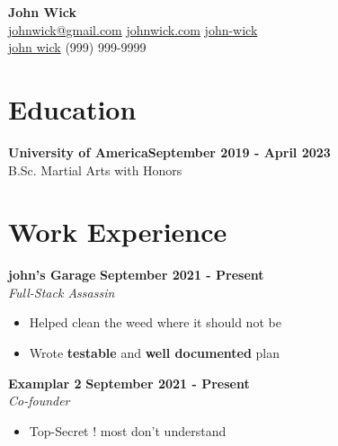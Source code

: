 \documentclass[letterpaper, 11pt]{article}
\newcommand{\iconSpace}{\hspace{1px}}
\newcommand{\bulletSpace}{\vspace{-8pt}}
\newcommand{\hSpace}{\hspace{8px}}
\newcommand{\secStartSpace}{\vspace{3pt}}
\newcommand{\secEndSpace}{\vspace{5pt}}
\newcommand{\spaceCollapse}{\vspace{-5pt}}
\newcommand{\workHeader}[3]{
\noindent \textbf{#1} \hfill \textbf{#3}\\
	\textit{#2}
}
\begin{document}
\begin{center} 
	{\Large \textbf{John Wick}}\\
	\vspace{1px}
	{\footnotesize
		 \href{mailto:johnwick@gmail.com}{johnwick@gmail.com} 
		\hSpace
		 \iconSpace \href{johnwick.com}{johnwick.com} 
		\hSpace 
		 \hspace{.1px} \href{https://www.linkedin.com/in/john-wick/}{john-wick} 
		\hSpace
		}\\
	{\footnotesize
		 \iconSpace \href{https://github.com/john-wick}{john wick}
		\hSpace 
		 \iconSpace
		(999) 999-9999
	}
\end{center}
\spaceCollapse


\section{\color{red} \textbf{Education}}
\secStartSpace

\begin{addmargin}[1em]{1em}
	\textbf{University of America}\hfill \textbf{September 2019 - April 2023}\\
	\setlength\parindent{1cm} B.Sc. Martial Arts with Honors
\end{addmargin}
\secEndSpace


\section{\color{red} \textbf{Work Experience}}
\secStartSpace

\begin{addmargin}[1em]{1em}
		
	\noindent \textbf{john's Garage} \hfill \textbf{September 2021 - Present}\\
	\textit{Full-Stack Assassin}
	\spaceCollapse
	\begin{itemize}
		\item Helped clean the weed where it should not be
		      \bulletSpace
		\item Wrote \textbf{testable} and \textbf{well documented} plan
	\end{itemize}
		
	\workHeader{Examplar 2}{Co-founder}{September 2021 - Present} 
	\spaceCollapse
	\begin{itemize}
		\item Top-Secret ! most don't understand
	\end{itemize}
\end{addmargin}
\secEndSpace
\end{document}
